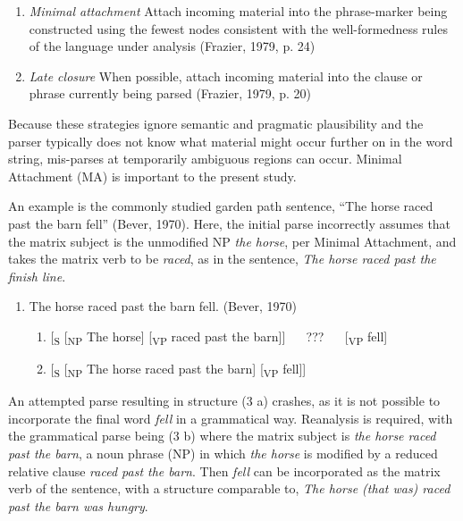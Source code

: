 \documentclass[11pt,oneside]{book}
\providecommand{\tightlist}{%
  \setlength{\itemsep}{0pt}\setlength{\parskip}{0pt}}
\begin{document}
\begin{enumerate}
\def\labelenumi{(\arabic{enumi})}
\item
  \emph{Minimal attachment} \linebreak\nopagebreak
  Attach incoming material into the phrase-marker being constructed using the fewest nodes consistent with the well-formedness rules of the language under analysis (Frazier, 1979, p. 24)
\item
  \emph{Late closure} \linebreak\nopagebreak
  When possible, attach incoming material into the clause or phrase currently being parsed (Frazier, 1979, p. 20)
\end{enumerate}

Because these strategies ignore semantic and pragmatic plausibility and the parser typically does not know what material might occur further on in the word string, mis-parses at temporarily ambiguous regions can occur. Minimal Attachment (MA) is important to the present study.

An example is the commonly studied garden path sentence, ``The horse raced past the barn fell'' (Bever, 1970). Here, the initial parse incorrectly assumes that the matrix subject is the unmodified NP \emph{the horse}, per Minimal Attachment, and takes the matrix verb to be \emph{raced}, as in the sentence, \emph{The horse raced past the finish line}.

\begin{enumerate}
\def\labelenumi{(\arabic{enumi})}
\setcounter{enumi}{2}
\tightlist
\item
  The horse raced past the barn fell. (Bever, 1970)

  \begin{enumerate}
  \def\labelenumii{\alph{enumii})}
  \tightlist
  \item
    {[}\textsubscript{S} {[}\textsubscript{NP} The horse{]} {[}\textsubscript{VP} raced past the barn{]}{]}   ???   {[}\textsubscript{VP} fell{]}
  \item
    {[}\textsubscript{S} {[}\textsubscript{NP} The horse raced past the barn{]} {[}\textsubscript{VP} fell{]}{]}
  \end{enumerate}
\end{enumerate}

An attempted parse resulting in structure (3 a) crashes, as it is not possible to incorporate the final word \emph{fell} in a grammatical way. Reanalysis is required, with the grammatical parse being (3 b) where the matrix subject is \emph{the horse raced past the barn}, a noun phrase (NP) in which \emph{the horse} is modified by a reduced relative clause \emph{raced past the barn}. Then \emph{fell} can be incorporated as the matrix verb of the sentence, with a structure comparable to, \emph{The horse (that was) raced past the barn was hungry}.
\end{document}
